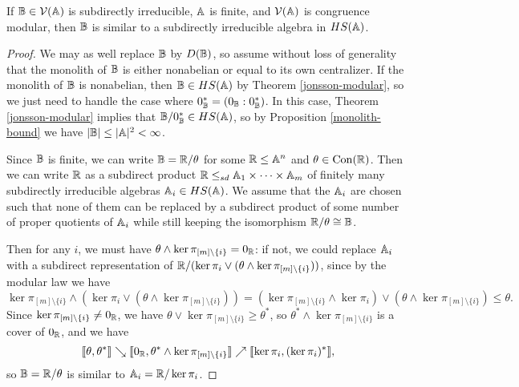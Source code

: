 \documentclass[letterpaper,11pt]{article}
\DeclareMathOperator{\Con}{Con}
\begin{document}
\begin{thm} If $\mathbb{B} \in \mathcal{V}(\mathbb{A})$ is subdirectly irreducible, $\mathbb{A}$ is finite, and $\mathcal{V}(\mathbb{A})$ is congruence modular, then $\mathbb{B}$ is similar to a subdirectly irreducible algebra in $HS(\mathbb{A})$.
\end{thm}
\begin{proof} We may as well replace $\mathbb{B}$ by $D(\mathbb{B})$, so assume without loss of generality that the monolith of $\mathbb{B}$ is either nonabelian or equal to its own centralizer. If the monolith of $\mathbb{B}$ is nonabelian, then $\mathbb{B} \in HS(\mathbb{A})$ by Theorem \ref{jonsson-modular}, so we just need to handle the case where $0_{\mathbb{B}}^* = (0_{\mathbb{B}} : 0_{\mathbb{B}}^*)$. In this case, Theorem \ref{jonsson-modular} implies that $\mathbb{B}/0_{\mathbb{B}}^* \in HS(\mathbb{A})$, so by Proposition \ref{monolith-bound} we have $|\mathbb{B}| \le |\mathbb{A}|^2 < \infty$.

Since $\mathbb{B}$ is finite, we can write $\mathbb{B} = \mathbb{R}/\theta$ for some $\mathbb{R} \le \mathbb{A}^n$ and $\theta \in \Con(\RR)$. Then we can write $\mathbb{R}$ as a subdirect product $\mathbb{R} \le_{sd} \mathbb{A}_1 \times \cdots \times \mathbb{A}_m$ of finitely many subdirectly irreducible algebras $\mathbb{A}_i \in HS(\mathbb{A})$. We assume that the $\mathbb{A}_i$ are chosen such that none of them can be replaced by a subdirect product of some number of proper quotients of $\mathbb{A}_i$ while still keeping the isomorphism $\mathbb{R}/\theta \cong \mathbb{B}$.

Then for any $i$, we must have $\theta \wedge \ker \pi_{[m]\setminus\{i\}} = 0_{\mathbb{R}}$: if not, we could replace $\mathbb{A}_i$ with a subdirect representation of $\mathbb{R}/(\ker \pi_i \vee (\theta \wedge \ker \pi_{[m]\setminus\{i\}}))$, since by the modular law we have
\[
\ker \pi_{[m]\setminus \{i\}} \wedge (\ker \pi_i \vee (\theta \wedge \ker \pi_{[m]\setminus\{i\}})) = (\ker \pi_{[m]\setminus \{i\}} \wedge \ker \pi_i) \vee (\theta \wedge \ker \pi_{[m]\setminus\{i\}}) \le \theta.
\]
Since $\ker \pi_{[m]\setminus \{i\}} \ne 0_{\mathbb{R}}$, we have $\theta \vee \ker \pi_{[m]\setminus \{i\}} \ge \theta^*$, so $\theta^* \wedge \ker \pi_{[m]\setminus \{i\}}$ is a cover of $0_{\mathbb{R}}$, and we have
\[
\llbracket \theta, \theta^* \rrbracket \searrow \llbracket 0_{\mathbb{R}}, \theta^* \wedge \ker \pi_{[m]\setminus \{i\}} \rrbracket \nearrow \llbracket \ker \pi_i, (\ker \pi_i)^* \rrbracket,
\]
so $\mathbb{B} = \mathbb{R}/\theta$ is similar to $\mathbb{A}_i = \mathbb{R}/\ker \pi_i$.
\end{proof}
\end{document}
